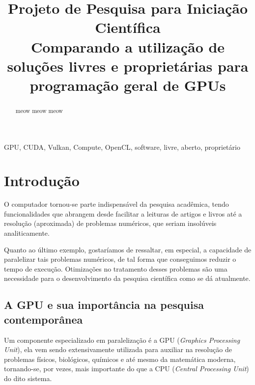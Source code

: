 \documentclass[10pt, conference]{IEEEtran}
\begin{document}
\title{\textbf{Projeto de Pesquisa para Iniciação Científica} \\
{Comparando a utilização de soluções livres e proprietárias para programação geral de GPUs}
}

\author{
\and
{}
}

\maketitle

\begin{abstract}
    meow meow meow
\end{abstract}

\begin{IEEEkeywords}
    GPU, CUDA, Vulkan, Compute, OpenCL, software, livre, aberto, proprietário
\end{IEEEkeywords}

\section{Introdução}

O computador tornou-se parte indispensável da pesquisa acadêmica, tendo
funcionalidades que abrangem desde facilitar a leituras de artigos e livros até
a resolução (aproximada) de problemas numéricos, que seriam insolúveis
analiticamente.

Quanto ao último exemplo, gostaríamos de ressaltar, em especial, a capacidade
de paralelizar tais problemas numéricos, de tal forma que conseguimos reduzir o
tempo de execução. Otimizações no tratamento desses problemas são uma
necessidade para o desenvolvimento da pesquisa científica como se dá atualmente.

\subsection{A GPU e sua importância na pesquisa contemporânea}

Um componente especializado em paralelização é a GPU (\textit{Graphics
Processing Unit}), ela vem sendo extensivamente utilizada para auxiliar na
resolução de problemas físicos, biológicos, químicos e até mesmo da matemática
moderna, tornando-se, por vezes, mais importante do que a CPU (\textit{Central
Processing Unit}) do dito sistema.
\end{document}
